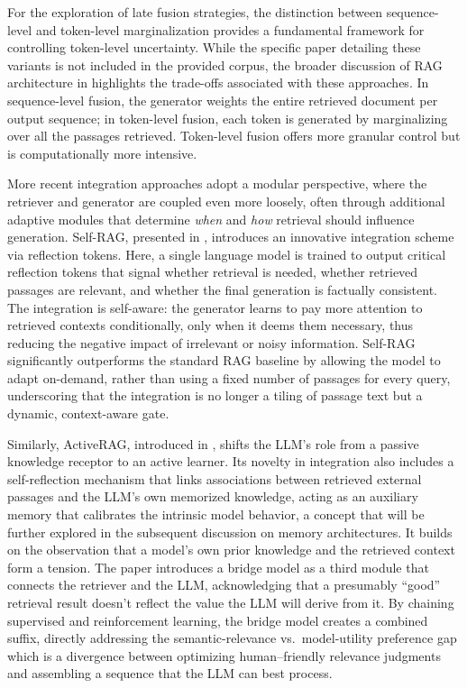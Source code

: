 \documentclass[11pt]{article}
\begin{document}
For the exploration of late fusion strategies, the distinction between sequence-level and token-level marginalization provides a fundamental framework for controlling token-level uncertainty. While the specific paper detailing these variants is not included in the provided corpus, the broader discussion of RAG architecture in \cite{ref23} highlights the trade-offs associated with these approaches. In sequence-level fusion, the generator weights the entire retrieved document per output sequence; in token-level fusion, each token is generated by marginalizing over all the passages retrieved. Token-level fusion offers more granular control but is computationally more intensive.

More recent integration approaches adopt a modular perspective, where the retriever and generator are coupled even more loosely, often through additional adaptive modules that determine \emph{when} and \emph{how} retrieval should influence generation. Self-RAG, presented in \cite{ref41}, introduces an innovative integration scheme via reflection tokens. Here, a single language model is trained to output critical reflection tokens that signal whether retrieval is needed, whether retrieved passages are relevant, and whether the final generation is factually consistent. The integration is self-aware: the generator learns to pay more attention to retrieved contexts conditionally, only when it deems them necessary, thus reducing the negative impact of irrelevant or noisy information. Self-RAG significantly outperforms the standard RAG baseline by allowing the model to adapt on-demand, rather than using a fixed number of passages for every query, underscoring that the integration is no longer a tiling of passage text but a dynamic, context-aware gate.

Similarly, ActiveRAG, introduced in \cite{ref36}, shifts the LLM's role from a passive knowledge receptor to an active learner. Its novelty in integration also includes a self-reflection mechanism that links associations between retrieved external passages and the LLM's own memorized knowledge, acting as an auxiliary memory that calibrates the intrinsic model behavior, a concept that will be further explored in the subsequent discussion on memory architectures. It builds on the observation that a model's own prior knowledge and the retrieved context form a tension. The \cite{ref55} paper introduces a bridge model as a third module that connects the retriever and the LLM, acknowledging that a presumably ``good'' retrieval result doesn't reflect the value the LLM will derive from it. By chaining supervised and reinforcement learning, the bridge model creates a combined suffix, directly addressing the semantic-relevance vs.~model-utility preference gap which is a divergence between optimizing human--friendly relevance judgments and assembling a sequence that the LLM can best process.
\end{document}
